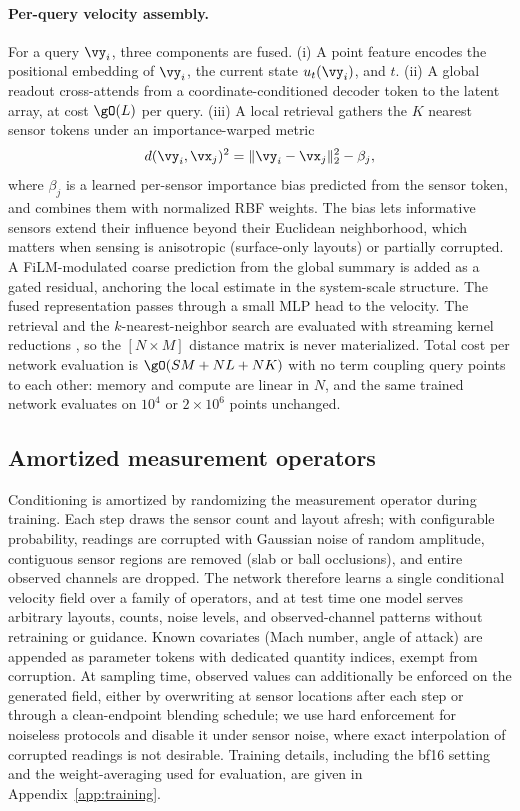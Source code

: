\documentclass{article} %
\begin{document}
\paragraph{Per-query velocity assembly.}
For a query $\vy_i$, three components are fused. (i) A point feature encodes the positional embedding of $\vy_i$, the current state $u_t(\vy_i)$, and $t$. (ii) A global readout cross-attends from a coordinate-conditioned decoder token to the latent array, at cost $\gO(L)$ per query. (iii) A local retrieval gathers the $K$ nearest sensor tokens under an importance-warped metric
\begin{equation}
d(\vy_i,\vx_j)^2=\|\vy_i-\vx_j\|_2^2 - \beta_j,
\label{eq:metric}
\end{equation}
where $\beta_j$ is a learned per-sensor importance bias predicted from the sensor token, and combines them with normalized RBF weights. The bias lets informative sensors extend their influence beyond their Euclidean neighborhood, which matters when sensing is anisotropic (surface-only layouts) or partially corrupted. A FiLM-modulated coarse prediction from the global summary is added as a gated residual, anchoring the local estimate in the system-scale structure. The fused representation passes through a small MLP head to the velocity. The retrieval and the $k$-nearest-neighbor search are evaluated with streaming kernel reductions \citep{charlier2021kernel}, so the $[N{\times}M]$ distance matrix is never materialized. Total cost per network evaluation is $\gO(SM + NL + NK)$ with no term coupling query points to each other: memory and compute are linear in $N$, and the same trained network evaluates on $10^{4}$ or $2\times10^{6}$ points unchanged.

\subsection{Amortized measurement operators}
\label{sec:method-operators}

Conditioning is amortized by randomizing the measurement operator during training. Each step draws the sensor count and layout afresh; with configurable probability, readings are corrupted with Gaussian noise of random amplitude, contiguous sensor regions are removed (slab or ball occlusions), and entire observed channels are dropped. The network therefore learns a single conditional velocity field over a family of operators, and at test time one model serves arbitrary layouts, counts, noise levels, and observed-channel patterns without retraining or guidance. Known covariates (Mach number, angle of attack) are appended as parameter tokens with dedicated quantity indices, exempt from corruption. At sampling time, observed values can additionally be enforced on the generated field, either by overwriting at sensor locations after each step or through a clean-endpoint blending schedule; we use hard enforcement for noiseless protocols and disable it under sensor noise, where exact interpolation of corrupted readings is not desirable. Training details, including the bf16 setting and the weight-averaging used for evaluation, are given in Appendix~\ref{app:training}.
\end{document}
